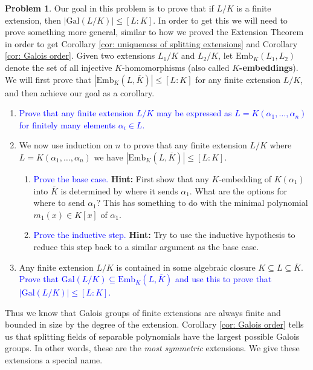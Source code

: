\documentclass[11pt]{article}
\def\gal{\mathrm{Gal}}
\def\emb{\mathrm{Emb}}
\theoremstyle{definition}
\newtheorem{problem}{Problem}[section]
\numberwithin{equation}{subsection}
\newcommand{\blue}[1]{\textcolor{blue}{#1}}
\begin{document}
\begin{problem}
    Our goal in this problem is to prove that if $L/K$ is a finite extension, then $|\gal(L/K)| \leq [L : K]$.
    In order to get this we will need to prove something more general, similar to how we proved the Extension Theorem in order to get Corollary \ref{cor: uniqueness of splitting extensions} and Corollary \ref{cor: Galois order}.
    Given two extensions $L_1/K$ and $L_2/K$, let $\emb_K(L_1,L_2)$ denote the set of all injective $K$-homomorphisms (also called \textbf{$K$-embeddings}).
    We will first prove that $|\emb_K(L,\overline{K})| \leq [L : K]$ for any finite extension $L/K$, and then achieve our goal as a corollary.
    \begin{enumerate}
        \item \blue{Prove that any finite extension $L/K$ may be expressed as $L = K(\alpha_1,\ldots, \alpha_n)$ for finitely many elements $\alpha_i \in L$.}

        \item We now use induction on $n$ to prove that any finite extension $L/K$ where $L = K(\alpha_1,\ldots, \alpha_n)$ we have $|\emb_K(L,\overline{K})| \leq [L : K]$.
        \begin{enumerate}
            \item \blue{Prove the base case.}
            \textbf{Hint:}
            First show that any $K$-embedding of $K(\alpha_1)$ into $\overline{K}$ is determined by where it sends $\alpha_1$.
            What are the options for where to send $\alpha_1$?
            This has something to do with the minimal polynomial $m_1(x) \in K[x]$ of $\alpha_1$.

            \item \blue{Prove the inductive step.}
            \textbf{Hint:}
            Try to use the inductive hypothesis to reduce this step back to a similar argument as the base case.
        \end{enumerate}

        \item Any finite extension $L/K$ is contained in some algebraic closure $K \subseteq L \subseteq \overline{K}$.
        \blue{Prove that $\gal(L/K) \subseteq \emb_K(L,\overline{K})$ and use this to prove that $|\gal(L/K)| \leq [L : K]$.}
    \end{enumerate}
\end{problem}

Thus we know that Galois groups of finite extensions are always finite and bounded in size by the degree of the extension.
Corollary \ref{cor: Galois order} tells us that splitting fields of separable polynomials have the largest possible Galois groups.
In other words, these are the \emph{most symmetric} extensions.
We give these extensions a special name.
\end{document}
